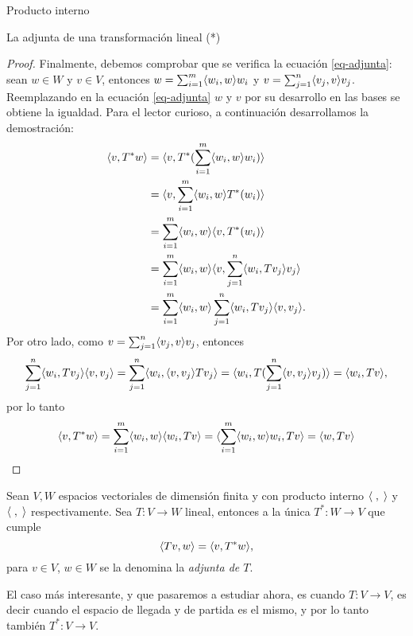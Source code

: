 \begin{chapter}{Producto interno}
\begin{section}{La adjunta de una transformaci\'on lineal (*)}
\begin{proof}
        Finalmente,  debemos comprobar que se verifica la ecuación \eqref{eq-adjunta}: sean  $w \in W$ y $v \in V$, entonces $w = \sum_{i=1}^{m} \langle w_i,w\rangle w_i$ y $v = \sum_{j=1}^{n} \langle v_j,v\rangle v_j$. Reemplazando en  la ecuación \eqref{eq-adjunta} $w$ y $v$ por su desarrollo en las bases se obtiene la igualdad. Para el lector curioso, a continuación desarrollamos la demostración:
        \begin{align*}
            \langle v,T^*w\rangle &= 	\langle v, T^*(\sum_{i=1}^{m} \langle w_i,w\rangle w_i) \rangle\\
             &= \langle v, \sum_{i=1}^{m} \langle w_i,w\rangle T^*(w_i) \rangle\\
             &=	\sum_{i=1}^{m} \langle w_i,w\rangle\langle v,  T^*(w_i) \rangle\\
             &=\sum_{i=1}^{m} \langle w_i,w\rangle\langle v,  \sum_{j=1}^{n} \langle w_i,Tv_j\rangle v_j\rangle\\
             &=\sum_{i=1}^{m} \langle w_i,w\rangle \sum_{j=1}^{n} \langle w_i,Tv_j\rangle\langle v,  v_j\rangle.
        \end{align*}
        Por otro lado, como $v = \sum_{j=1}^{n} \langle v_j,v\rangle v_j$, entonces
        \begin{equation*}
            \sum_{j=1}^{n} \langle w_i,Tv_j\rangle\langle v,  v_j\rangle = \sum_{j=1}^{n} \langle w_i,\langle v,  v_j\rangle Tv_j\rangle = \langle w_i, T (\sum_{j=1}^{n}\langle v,  v_j\rangle v_j)\rangle = \langle w_i, T v\rangle, 
        \end{equation*}
        por lo tanto 
        \begin{equation*}
            \langle v,T^*w\rangle = \sum_{i=1}^{m} \langle w_i,w\rangle \langle w_i, T v\rangle =  \langle\sum_{i=1}^{m} \langle w_i,w\rangle w_i, T v\rangle = \langle w, T v\rangle
        \end{equation*}
        \end{proof}
        
        \begin{definicion}
            Sean $V, W$ espacios vectoriales de dimensión finita y con producto interno $\langle \;,\;\rangle$ y $\langle \;,\;\rangle$ respectivamente. Sea $T: V \to W$ lineal, entonces a la única $T^*: W \to V$ que cumple
            \begin{equation}\label{eq-adjunta-2}
            \langle Tv,w\rangle = \langle v,T^*w\rangle,
            \end{equation}  
            para $v\in V$, $w \in W$ se la denomina la \textit{adjunta de $T$}.
        \end{definicion}
        
        \begin{observacion*} El caso más interesante, y que pasaremos a estudiar ahora, es cuando $T: V \to V$, es decir cuando el espacio de llegada y  de partida es el mismo, y por lo tanto también $T^*: V \to V$. 
        \end{observacion*}
        

\end{section}
\end{chapter}
